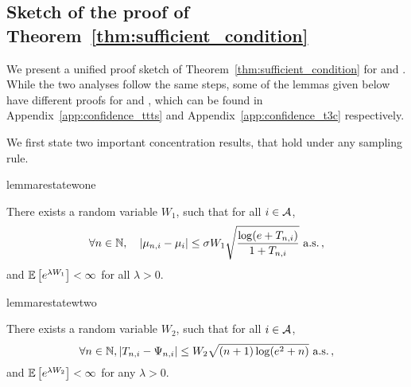 % 

\subsection{Sketch of the proof of Theorem~\ref{thm:sufficient_condition}}

We present a unified proof sketch of Theorem~\ref{thm:sufficient_condition} for \TTTS and \TCC. While the two analyses follow the same steps, some of the lemmas given below have different proofs for \TTTS and \TCC, which can be found in Appendix~\ref{app:confidence_ttts} and Appendix~\ref{app:confidence_t3c} respectively.

We first state two important concentration results, that hold under any sampling rule. 

\begin{restatable}{lemma}{restatewone}
\begin{leftbar}\label{lemma:means}
    There exists a random variable $W_1$, such that for all $i\in\mathcal{A}$,
    \[
        \forall n\in{\mathbb N}, \quad |\mu_{n,i} - \mu_{i}| \leq \sigma W_1 \sqrt{\frac{\log(e+T_{n,i})}{1+T_{n,i}}} \text{ a.s.}\,,
    \]
    and $\mathbb{E}\left[e^{\lambda W_1}\right] < \infty$ for all $\lambda > 0$.
\end{leftbar}
\end{restatable}

\begin{restatable}{lemma}{restatewtwo}\label{lemma:link}
\begin{leftbar}[lemmabar]
There exists a random variable $W_2$, such that for all $i\in\mathcal{A}$,
    \[
        \forall n\in{\mathbb N}, |T_{n,i}-\Psi_{n,i}| \leq W_2\sqrt{(n+1)\log(e^2+n)} \text{ a.s.}\,,
    \]
and $\mathbb{E}\left[e^{\lambda W_2}\right] < \infty$ for any $\lambda > 0$.
\end{leftbar}
\end{restatable}


